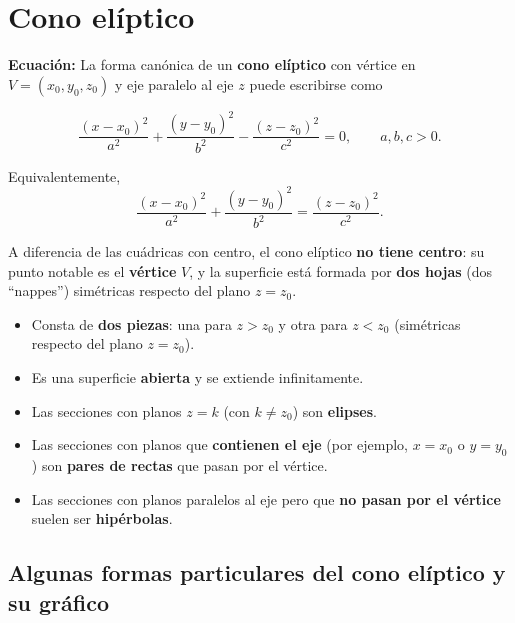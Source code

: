 \documentclass[11pt]{article}
\begin{document}
\section{Cono elíptico}

\textbf{Ecuación:} La forma canónica de un \textbf{cono elíptico} con vértice en
$V=(x_0,y_0,z_0)$ y eje paralelo al eje $z$ puede escribirse como

\[
\frac{(x-x_0)^2}{a^2}+\frac{(y-y_0)^2}{b^2}-\frac{(z-z_0)^2}{c^2}=0,
\qquad a,b,c>0.
\]

Equivalentemente,
\[
\frac{(x-x_0)^2}{a^2}+\frac{(y-y_0)^2}{b^2}
=\frac{(z-z_0)^2}{c^2}.
\]

\medskip

A diferencia de las cuádricas con centro, el cono elíptico \textbf{no tiene centro}:
su punto notable es el \textbf{vértice} $V$, y la superficie está formada por
\textbf{dos hojas} (dos ``nappes'') simétricas respecto del plano $z=z_0$.

\begin{itemize}
    \item Consta de \textbf{dos piezas}:
    una para $z>z_0$ y otra para $z<z_0$ (simétricas respecto del plano $z=z_0$).
    \item Es una superficie \textbf{abierta} y se extiende infinitamente.
    \item Las secciones con planos $z=k$ (con $k\neq z_0$) son \textbf{elipses}.
    \item Las secciones con planos que \textbf{contienen el eje} (por ejemplo, $x=x_0$ o $y=y_0$)
    son \textbf{pares de rectas} que pasan por el vértice.
    \item Las secciones con planos paralelos al eje pero que \textbf{no pasan por el vértice}
    suelen ser \textbf{hipérbolas}.
\end{itemize}

\subsection*{Algunas formas particulares del cono elíptico y su gráfico}
\end{document}
